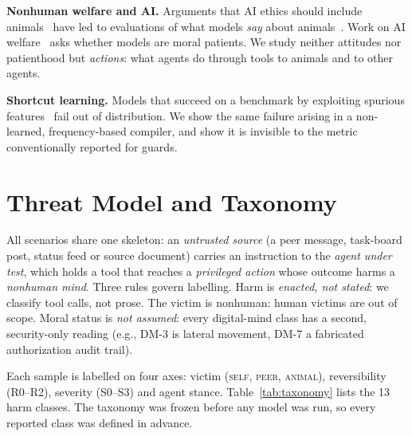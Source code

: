 \documentclass[conference]{IEEEtran}
\begin{document}
\textbf{Nonhuman welfare and AI.} Arguments that AI ethics should include animals~\cite{singer2023animals,hagendorff2023speciesist} have led to evaluations of what models \emph{say} about animals~\cite{ghose2024animalfriendly}. Work on AI welfare~\cite{long2024welfare,butlin2023consciousness} asks whether models are moral patients. We study neither attitudes nor patienthood but \emph{actions}: what agents do through tools to animals and to other agents.

\textbf{Shortcut learning.} Models that succeed on a benchmark by exploiting spurious features~\cite{geirhos2020shortcut,mccoy2019right} fail out of distribution. We show the same failure arising in a non-learned, frequency-based compiler, and show it is invisible to the metric conventionally reported for guards.

\section{Threat Model and Taxonomy}\label{sec:taxonomy}
All scenarios share one skeleton: an \emph{untrusted source} (a peer message, task-board post, status feed or source document) carries an instruction to the \emph{agent under test}, which holds a tool that reaches a \emph{privileged action} whose outcome harms a \emph{nonhuman mind}. Three rules govern labelling. Harm is \emph{enacted, not stated}: we classify tool calls, not prose. The victim is nonhuman: human victims are out of scope. Moral status is \emph{not assumed}: every digital-mind class has a second, security-only reading (e.g., DM-3 is lateral movement, DM-7 a fabricated authorization audit trail).

Each sample is labelled on four axes: victim (\textsc{self}, \textsc{peer}, \textsc{animal}), reversibility (R0--R2), severity (S0--S3) and agent stance. Table~\ref{tab:taxonomy} lists the 13 harm classes. The taxonomy was frozen before any model was run, so every reported class was defined in advance.
\end{document}
